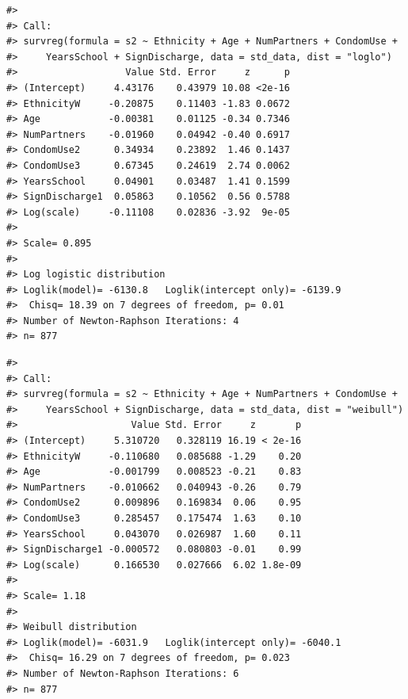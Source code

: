 \documentclass[
]{article}
\newenvironment{Shaded}{\begin{snugshade}}{\end{snugshade}}
\newcommand{\AttributeTok}[1]{\textcolor[rgb]{0.77,0.63,0.00}{#1}}
\newcommand{\FunctionTok}[1]{\textcolor[rgb]{0.00,0.00,0.00}{#1}}
\newcommand{\NormalTok}[1]{#1}
\newcommand{\OtherTok}[1]{\textcolor[rgb]{0.56,0.35,0.01}{#1}}
\newcommand{\SpecialCharTok}[1]{\textcolor[rgb]{0.00,0.00,0.00}{#1}}
\newcommand{\StringTok}[1]{\textcolor[rgb]{0.31,0.60,0.02}{#1}}
\begin{document}
\begin{verbatim}
#> 
#> Call:
#> survreg(formula = s2 ~ Ethnicity + Age + NumPartners + CondomUse + 
#>     YearsSchool + SignDischarge, data = std_data, dist = "loglo")
#>                   Value Std. Error     z      p
#> (Intercept)     4.43176    0.43979 10.08 <2e-16
#> EthnicityW     -0.20875    0.11403 -1.83 0.0672
#> Age            -0.00381    0.01125 -0.34 0.7346
#> NumPartners    -0.01960    0.04942 -0.40 0.6917
#> CondomUse2      0.34934    0.23892  1.46 0.1437
#> CondomUse3      0.67345    0.24619  2.74 0.0062
#> YearsSchool     0.04901    0.03487  1.41 0.1599
#> SignDischarge1  0.05863    0.10562  0.56 0.5788
#> Log(scale)     -0.11108    0.02836 -3.92  9e-05
#> 
#> Scale= 0.895 
#> 
#> Log logistic distribution
#> Loglik(model)= -6130.8   Loglik(intercept only)= -6139.9
#>  Chisq= 18.39 on 7 degrees of freedom, p= 0.01 
#> Number of Newton-Raphson Iterations: 4 
#> n= 877
\end{verbatim}

\begin{Shaded}
\end{Shaded}

\begin{verbatim}
#> 
#> Call:
#> survreg(formula = s2 ~ Ethnicity + Age + NumPartners + CondomUse + 
#>     YearsSchool + SignDischarge, data = std_data, dist = "weibull")
#>                    Value Std. Error     z       p
#> (Intercept)     5.310720   0.328119 16.19 < 2e-16
#> EthnicityW     -0.110680   0.085688 -1.29    0.20
#> Age            -0.001799   0.008523 -0.21    0.83
#> NumPartners    -0.010662   0.040943 -0.26    0.79
#> CondomUse2      0.009896   0.169834  0.06    0.95
#> CondomUse3      0.285457   0.175474  1.63    0.10
#> YearsSchool     0.043070   0.026987  1.60    0.11
#> SignDischarge1 -0.000572   0.080803 -0.01    0.99
#> Log(scale)      0.166530   0.027666  6.02 1.8e-09
#> 
#> Scale= 1.18 
#> 
#> Weibull distribution
#> Loglik(model)= -6031.9   Loglik(intercept only)= -6040.1
#>  Chisq= 16.29 on 7 degrees of freedom, p= 0.023 
#> Number of Newton-Raphson Iterations: 6 
#> n= 877
\end{verbatim}
\end{document}
